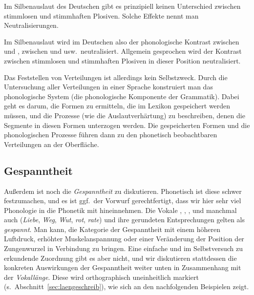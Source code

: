 Im Silbenauslaut des Deutschen gibt es prinzipiell keinen Unterschied zwischen stimmlosen und stimmhaften Plosiven.
Solche Effekte nennt man Neutralisierungen.


Im Silbenauslaut wird im Deutschen also der phonologische Kontrast zwischen \textipa{[g]} und \textipa{[k]}, zwischen \textipa{[d]} und \textipa{[t]} usw.\ neutralisiert.
Allgemein gesprochen wird der Kontrast zwischen stimmlosen und stimmhaften Plosiven in dieser Position neutralisiert.

Das Feststellen von Verteilungen ist allerdings kein Selbstzweck.
Durch die Untersuchung aller Verteilungen in einer Sprache konstruiert man das phonologische System (die phonologische Komponente der Grammatik).
Dabei geht es darum, die Formen zu ermitteln, die im Lexikon gespeichert werden müssen, und die Prozesse (wie die Auslautverhärtung) zu beschreiben, denen die Segmente in diesen Formen unterzogen werden.
Die gespeicherten Formen und die phonologischen Prozesse führen dann zu den phonetisch beobachtbaren Verteilungen an der Oberfläche.

\subsection{Gespanntheit}

\label{sec:gespanntheit}

Außerdem ist noch die \textit{Gespanntheit} zu diskutieren.
Phonetisch ist diese schwer festzumachen, und es ist ggf.\ der Vorwurf gerechtfertigt, dass wir hier sehr viel Phonologie in die Phonetik mit hineinnehmen.
Die Vokale \textipa{[i]}, \textipa{[e]}, \textipa{[u]}, \textipa{[o]} und manchmal auch \textipa{[a]} (\textit{Liebe}, \textit{Weg}, \textit{Wut}, \textit{rot}, \textit{rate}) und ihre gerundeten Entsprechungen gelten als \textit{gespannt}.
Man kann, die Kategorie der Gespanntheit mit einem höheren Luftdruck, erhöhter Muskelanspannung oder einer Veränderung der Position der Zungenwurzel in Verbindung zu bringen.
Eine einfache und im Selbstversuch zu erkundende Zuordnung gibt es aber nicht, und wir diskutieren stattdessen die konkreten Auswirkungen der Gespanntheit weiter unten in Zusammenhang mit der \textit{Vokallänge}.
Diese wird orthographisch uneinheitlich markiert (s.\ Abschnitt~\ref{sec:laengeschreib}), wie sich an den nachfolgenden Beispielen zeigt.

